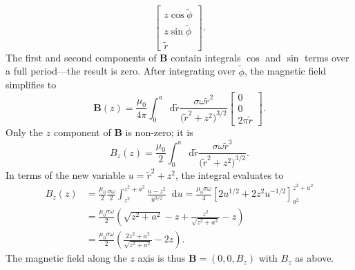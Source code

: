 \documentclass[11pt, a4paper]{article}
\newcommand{\diff}{\mathop{}\!\mathrm{d}} %
\renewcommand{\vec}[1]{\bm{#1}} %
\renewcommand{\t}[1]{\tilde{#1}} %
\newcommand{\B}{\vec{B}}  %
\begin{document}
\begin{itemize}
\begin{equation*}
		\begin{bmatrix}
			z \cos \t{\phi}\\
			z \sin \t{\phi}\\
			\t{r}
		\end{bmatrix}.
	\end{equation*}
	The first and second components of $ \B $ contain integrals $ \cos $ and $ \sin $ terms over a full period---the result is zero. After integrating over $ \t{\phi} $, the magnetic field simplifies to
	\begin{equation*}
		\B(z) = \frac{\mu_{0}}{4 \pi} \int_{0}^{a} \diff \t{r} \frac{\sigma \omega \t{r}^{2}}{\big(\tilde{r}^{2} + z^{2}\big)^{3/2}} 
		\begin{bmatrix}
			0\\
			0\\
			2\pi \t{r}
		\end{bmatrix}.
	\end{equation*}
	Only the $ z $ component of $ \B $ is non-zero; it is
	\begin{equation*}
		B_{z}(z) = \frac{\mu_{0}}{2} \int_{0}^{a} \diff \t{r} \frac{\sigma \omega \t{r}^{3}}{\big(\tilde{r}^{2} + z^{2}\big)^{3/2}}.
	\end{equation*}
	In terms of the new variable $ u = \tilde{r}^{2} + z^{2} $, the integral evaluates to
	\begin{align*}
		B_{z}(z) &= \frac{\mu_{0}}{2} \frac{\sigma \omega}{2}\int_{z^{2}}^{z^{2} + a^{2}}\frac{u-z^{2}}{u^{3/2}} \diff u = \frac{\mu_{0}\sigma \omega}{4} \left[2u^{1/2} + 2z^{2}u^{-1/2}\right]_{a^{2}}^{z^{2}+a^{2}}\\
		 & = \frac{\mu_{0}\sigma \omega}{2} \left(\sqrt{z^{2} + a^{2}} - z + \frac{z^{2}}{\sqrt{z^{2} + a^{2}}} - z\right)\\
		 & = \frac{\mu_{0}\sigma \omega }{2}\left(\frac{2z^{2} + a^{2}}{\sqrt{z^{2} + a^{2}}} - 2z\right).
	\end{align*}
	The magnetic field along the $ z $ axis is thus $ \B = (0, 0, B_{z}) $ with $ B_{z} $ as above.
	

\end{itemize}
\end{document}
